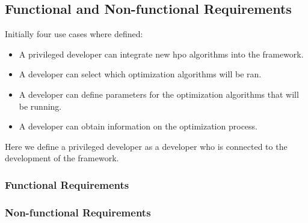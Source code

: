 
\subsection{Functional and Non-functional Requirements}

Initially four use cases where defined:

\begin{itemize}
	\item A privileged developer can integrate new \acrshort{hpo} algorithms into the framework.
	\item A developer can select which optimization algorithms will be ran.
	\item A developer can define parameters for the optimization algorithms that will be running.
	\item A developer can obtain information on the optimization process.
\end{itemize}

Here we define a privileged developer as a developer who is connected to the development of the framework.

\subsubsection{Functional Requirements}

\subsubsection{Non-functional Requirements}
